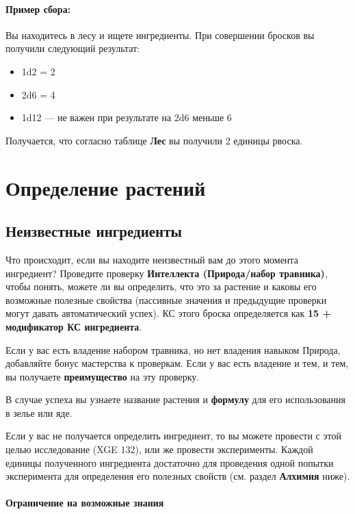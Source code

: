 \documentclass[a4paper, 9pt, twocolumn]{book}
\begin{document}
	\paragraph*{Пример сбора:}
	
	Вы находитесь в лесу и ищете ингредиенты. При совершении бросков вы получили следующий результат:
	
	\begin{itemize}
		\item 1d2 = 2
		\item 2d6 = 4
		\item 1d12 --- не важен при результате на 2d6 меньше 6
	\end{itemize}

	Получается, что согласно таблице \textbf{Лес} вы получили 2 единицы рвоска.
	
	\section{Определение растений}
	
	\subsection{Неизвестные ингредиенты}
	
	Что происходит, если вы находите неизвестный вам до этого момента ингредиент? Проведите проверку \textbf{Интеллекта (Природа/набор травника)}, чтобы понять, можете ли вы определить, что это за растение и каковы его возможные полезные свойства (пассивные значения и предыдущие проверки могут давать автоматический успех). КС этого броска определяется как \textbf{15 + модификатор КС ингредиента}.
	
	Если у вас есть владение набором травника, но нет владения навыком Природа, добавляйте бонус мастерства к проверкам. Если у вас есть владение и тем, и тем, вы получаете \textbf{преимущество} на эту проверку.
	
	В случае успеха вы узнаете название растения и \textbf{формулу} для его использования в зелье или яде.
	
	
	Если у вас не получается определить ингредиент, то вы можете провести с этой целью исследование (XGE 132), или же провести эксперименты. Каждой единицы полученного ингредиента достаточно для проведения одной попытки эксперимента для определения его полезных свойств (см. раздел \textbf{Алхимия} ниже).
	
	\paragraph*{Ограничение на возможные знания}
	
\end{document}

